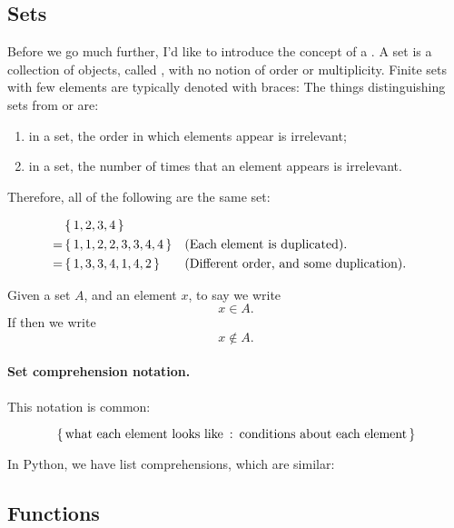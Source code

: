 \subsection{Sets}

Before we go much further, I'd like to introduce the concept of a
. A set is a collection of objects, called ,
with no notion of order or multiplicity. Finite sets with few elements
are typically denoted with braces: 
The things distinguishing sets from  or 
are:

\begin{enumerate}
\item in a set, the order in which elements appear is irrelevant;
\item in a set, the number of times that an element appears is
  irrelevant.
\end{enumerate}

Therefore, all of the following are the same set:

\begin{align*}
  & \left\{\, 1,2,3,4 \,\right\} \\
  = & \left\{\, 1,1,2,2,3,3,4,4 \,\right\} && \text{(Each element is duplicated).} \\
  = & \left\{\, 1, 3, 3, 4, 1, 4, 2 \,\right\} && \text{(Different order, and some duplication).}
\end{align*}

Given a set $A$, and an element $x$, to say  we write $$x \in A.$$ If  then we write $$x \notin A.$$

\paragraph{Set comprehension notation.}

This notation is common:

\begin{equation*}
  \left\{\, \text{what each element looks like} \::\: \text{conditions about
      each element} \,\right\}
\end{equation*}

In Python, we have list comprehensions, which are similar:


\subsection{Functions}


